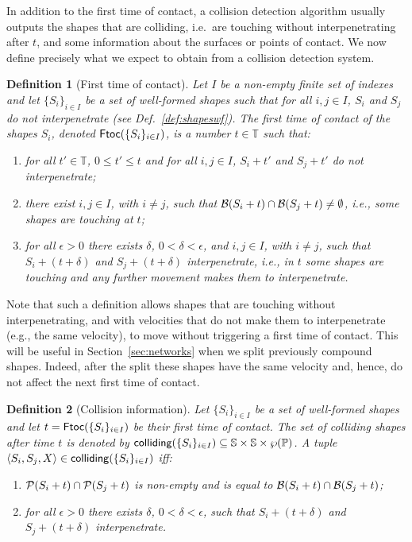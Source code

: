 \documentclass[11pt]{article}
\newcommand{\shapes}{\mathbb{S}}
\newcommand{\colliding}{{\sf colliding}}
\newcommand{\ftoc}{{\sf Ftoc}}
\newcommand{\pos}{{\mathbb P}}
\newcommand{\boundary}[1]{\ensuremath{{\cal B}(#1)}}
\newcommand{\points}[1]{\ensuremath{{\cal P}(#1)}}
\newcommand{\timedomain}{{\mathbb T}}
\newtheorem{definition}{Definition}
\begin{document}
In addition to the first time of contact, a collision detection algorithm usually outputs the shapes that are colliding, i.e.\ are touching without interpenetrating after $t$, and some information about the surfaces or points of contact. We now define precisely what we expect to obtain from a collision detection system.

\begin{definition}[First time of contact]
\label{def:ftoc}
Let $I$ be a non-empty finite set of indexes and let $\{S_i\}_{i \in I}$ be a set of well-formed
shapes such that for all $i,j \in I$, $S_i$ and $S_j$ do not interpenetrate (see Def.~\ref{def:shapeswf}).
The \emph{first time of contact} of the shapes $S_i$, denoted $\ftoc(\{S_i\}_{i \in I})$, is a
number $t\in \timedomain$ such that:
\begin{enumerate}
\item for all $t' \in \timedomain$, $0 \leq t' \leq t$ and for all $i,j \in I$, $S_i+t'$ and
$S_j+t'$ do not interpenetrate;

\item there exist $i,j \in I$, with $i\neq j$, such that $\boundary{S_i + t} \cap \boundary{S_j + t} \neq \emptyset$, i.e., some shapes are touching at $t$;

\item for all $\epsilon > 0$ there exists $\delta$, $0 < \delta < \epsilon$, and $i,j \in I$, with $i \neq j$, such that $S_i+ (t+\delta)$ and $S_j+(t+\delta)$ interpenetrate, i.e., in $t$ some shapes are touching and any further movement makes them to interpenetrate.
\end{enumerate}
\end{definition}

Note that such a definition allows shapes that are touching without interpenetrating, and with
velocities that do not make them to interpenetrate (e.g., the same velocity), to move without
triggering a first time of contact. This  will be useful in Section~\ref{sec:networks} when we split previously compound shapes. Indeed, after the split these shapes have the same velocity and, hence, do not affect the next first time of contact.

\begin{definition}[Collision information]\label{def:colls-information}
Let $\{S_i\}_{i \in I}$ be a set of well-formed shapes and let $t = \ftoc(\{S_i\}_{i \in I})$ be
their first time of contact. The {\em set of colliding shapes} after time $t$  is denoted by
$\colliding(\{S_i\}_{i \in I}) \subseteq \shapes \times \shapes \times \wp(\pos)$. A tuple
$\langle S_i,S_j, X \rangle \in \colliding(\{S_i\}_{i \in I})$ iff:

\begin{enumerate}

\item $\points{S_i+t} \cap \points{S_j+t}$ is \emph{non-empty} and is equal to $\boundary{S_i + t}
\cap \boundary{S_j + t}$;

\item for all $\epsilon > 0$ there exists $\delta$, $0 < \delta < \epsilon$, such that $S_i+
(t+\delta)$ and $S_j+(t+\delta)$ interpenetrate.
\end{enumerate}
\end{definition}
\end{document}
